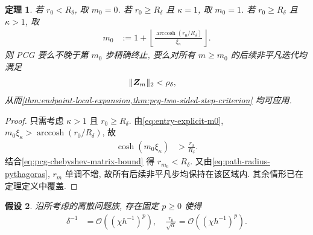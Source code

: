 \documentclass{ctexart}
\newcommand{\q}{\quad}
\renewcommand{\O}{\mathcal{O}}
\newcommand{\dt}{\delta}
\renewcommand{\ge}{\geqslant}
\DeclareMathOperator{\arccosh}{arccosh}
\DeclarePairedDelimiter\norm{\lVert}{\rVert}
\newtheorem{theorem}{定理}[section]
\newtheorem{assumption}[theorem]{假设}
\begin{document}
\begin{theorem}
\label{thm:explicit-local-entry}
若 $r_0<R_\dt$, 取 $m_0=0$. 若 $r_0\ge R_\dt$ 且 $\kappa=1$, 取 $m_0=1$. 若 $r_0\ge R_\dt$ 且 $\kappa>1$, 取
\begin{align}
    m_0&:=1+\left\lfloor
      \frac{
        \arccosh(r_0/R_\dt)
      }{\xi_\kappa}
    \right\rfloor.
    \label{eq:entry-explicit-m0}
\end{align}
则 PCG 要么不晚于第 $m_0$ 步精确终止, 要么对所有 $m\ge m_0$ 的后续非平凡迭代均满足
\begin{align}
    \norm{\bm Z_m}_2&<\rho_\dt,
    \label{eq:entry-local-condition}
\end{align}
从而\cref{thm:endpoint-local-expansion,thm:pcg-two-sided-step-criterion} 均可应用.
\end{theorem}

\begin{proof}
只需考虑 $\kappa>1$ 且 $r_0\ge R_\dt$. 由\cref{eq:entry-explicit-m0},
$m_0\xi_\kappa>\arccosh(r_0/R_\dt)$, 故
\begin{align}
    \cosh(m_0\xi_\kappa)&>\frac{r_0}{R_\dt}.
    \label{eq:entry-cosh-target}
\end{align}
结合\cref{eq:pcg-chebyshev-matrix-bound} 得 $r_{m_0}<R_\dt$. 又由\cref{eq:path-radius-pythagoras}, $r_m$ 单调不增, 故所有后续非平凡步均保持在该区域内. 其余情形已在定理定义中覆盖.
\end{proof}

\begin{assumption}
\label{ass:polynomial-data}
沿所考虑的离散问题族, 存在固定 $p\ge0$ 使得
\begin{align}
    \dt^{-1}&=\O\left((\chi h^{-1})^p\right),\q
    \frac{r_0}{\sqrt\alpha}=\O\left((\chi h^{-1})^p\right).
    \label{eq:polynomial-data}
\end{align}
\end{assumption}
\end{document}
